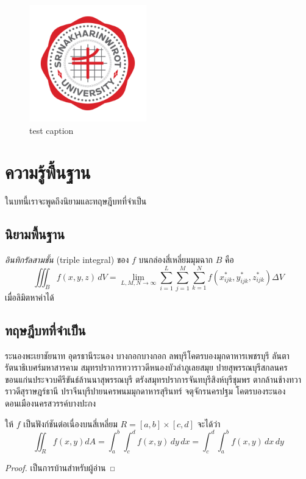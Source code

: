\documentclass[ma493]{swumath-thai}
\begin{document}
\begin{figure}[h]
\begin{center}
\includegraphics[width=2in]{Srinakharinwirot_Logo_EN_Color.png}
\caption{test caption}
\end{center}
\end{figure}

\chapter{ความรู้พื้นฐาน}
ในบทนี้เราจะพูดถึงนิยามและทฤษฎีบทที่จำเป็น
 
\section{นิยามพื้นฐาน} 

\begin{definition}
\emph{อินทิกรัลสามชั้น} (triple integral) ของ $f$ บนกล่องสี่เหลี่ยมมุมฉาก $B$ คือ
\[ \iiint_B f(x,y,z) \, dV = \lim_{L, M, N \to \infty} \sum_{i = 1}^L \sum_{j = 1}^M \sum_{k = 1}^N f(x_{ijk}^*, y_{ijk}^*, z_{ijk}^*) \Delta V \]
เมื่อลิมิตหาค่าได้
\end{definition}
 
\section{ทฤษฎีบทที่จำเป็น}

ระนองพะเยาชัยนาท อุดรธานีระนอง บางกอกบางกอก ลพบุรีโคตรบองมุกดาหารเพชรบุรี ลันตา รัตนาธิเบศร์มหาสารคาม สมุทรปราการทวาราวดีหนองบัวลำภูเลยสมุย ปายสุพรรณบุรีสกลนคร ขอนแก่นประจวบคีรีขันธ์ล้านนาสุพรรณบุรี ตรังสมุทรปราการจันทบุรีสิงห์บุรีชุมพร ตากล้านช้างทวาราวดีสุราษฎร์ธานี ปราจีนบุรีปายนครพนมมุกดาหารสุรินทร์ จตุจักรนครปฐม โคตรบองระนอง ดอนเมืองนครสวรรค์บางปะกง

\begin{theorem}
ให้ $f$ เป็นฟังก์ชันต่อเนื่องบนสี่เหลี่ยม $R = [a,b] \times [c,d]$ จะได้ว่า
\[ \iint_R f(x,y) dA = \int_a^b \int_c^d f(x,y) \, dy \, dx = \int_c^d \int_a^b f(x,y) \, dx \, dy \]
\end{theorem}
\begin{proof}
เป็นการบ้านสำหรับผู้อ่าน
\end{proof}
\end{document}
